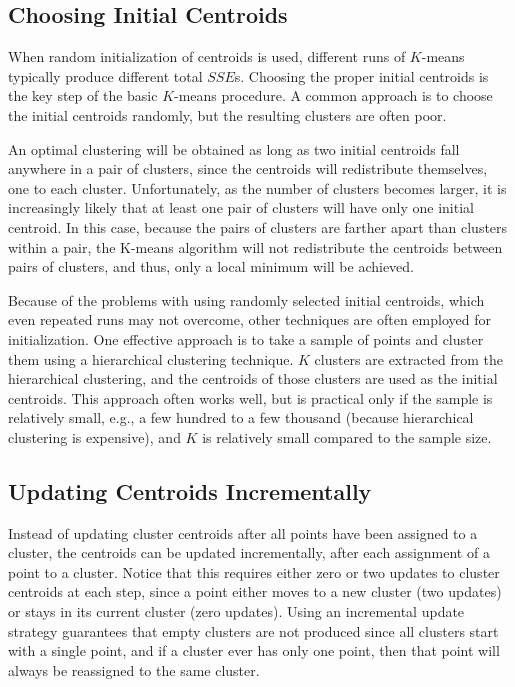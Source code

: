 \subsection{Choosing Initial Centroids}
When random initialization of centroids is used, different runs of $K$-means
typically produce different total $SSE$s. Choosing the proper initial centroids
is the key step of the basic $K$-means procedure.  A common approach is to choose
the initial centroids randomly, but the resulting clusters are often poor.

An optimal clustering will be obtained as long as two initial
centroids fall anywhere in a pair of clusters, since the centroids will redistribute
themselves,  one to each cluster. Unfortunately,  as the number of clusters
becomes larger, it is increasingly likely that at least one pair of clusters will
have only one initial centroid. In this case,
because the pairs of clusters are farther apart than clusters within a pair, the
K-means algorithm will not redistribute the centroids between pairs of clusters,
and thus, only a local minimum will be achieved.

Because of the problems with using randomly selected initial centroids,
which even repeated runs may not overcome, other techniques are often employed
for initialization.  One effective approach is to take a sample of points
and cluster them using a hierarchical clustering technique. $K$ clusters are extracted
from the hierarchical clustering, and the centroids of those clusters are
used as the initial centroids. This approach often works well, but is practical
only if the sample is relatively small, e.g., a few hundred to a few thousand
(because hierarchical clustering is expensive), and $K$ is relatively small compared
to the sample size.

\subsection{Updating Centroids Incrementally}
Instead of updating cluster centroids after all points have been assigned to a
cluster, the centroids can be updated incrementally, after each assignment of
a point to a cluster.  Notice that this requires either zero or two updates to
cluster centroids at each step, since a point either moves to a new cluster (two
updates) or stays in its current cluster (zero updates).  Using an incremental
update strategy guarantees that empty clusters are not produced since all
clusters start with a single point, and if a cluster ever has only one point, then
that point will always be reassigned to the same cluster.

